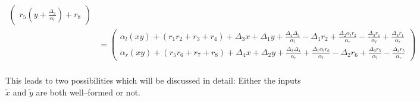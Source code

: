 \begin{align*}
\begin{pmatrix}
    r_5          \left(y + \frac{\Delta_3}{\alpha_l}\right) + r_8
  \end{pmatrix} \\
%
  & =
  \begin{pmatrix}
    \alpha_l(xy) + (r_1r_2 + r_3 + r_4)
    + \Delta_3x + \Delta_1y
    + \frac{\Delta_1\Delta_3}{\alpha_l}
    - \Delta_1r_2
    + \frac{\Delta_2\alpha_lr_2}{\alpha_r}
    - \frac{\Delta_3r_1}{\alpha_l}
    + \frac{\Delta_4r_1}{\alpha_r}
    \\
    \alpha_r(xy) + (r_5r_6 + r_7 + r_8)
    + \Delta_4x + \Delta_2y
    + \frac{\Delta_2\Delta_4}{\alpha_r}
    + \frac{\Delta_1\alpha_lr_6}{\alpha_l}
    - \Delta_2r_6
    + \frac{\Delta_3r_5}{\alpha_l}
    - \frac{\Delta_4r_5}{\alpha_r}
  \end{pmatrix} \\
%
\end{align*}

\noindent{}This leads to two possibilities which will be discussed in detail:
Either the inputs $\widetilde{x}$ and $\widetilde{y}$ are both well--formed or
not.


